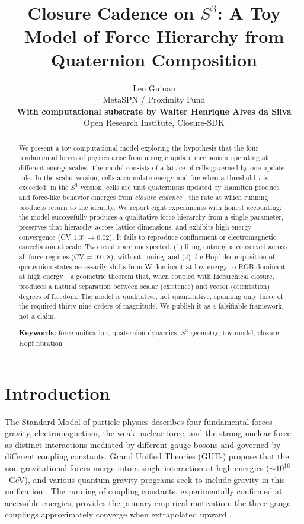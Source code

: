 \documentclass[letterpaper,12pt]{article}
\title{Closure Cadence on $S^3$: A Toy Model of Force Hierarchy from Quaternion Composition}
\author{
  Leo Guinan \\
  MetaSPN / Proximity Fund \\[6pt]
  \textbf{With computational substrate by Walter Henrique Alves da Silva} \\
  Open Research Institute, Closure-SDK
}
\date{}
\begin{document}
\maketitle

\begin{abstract}
We present a toy computational model exploring the hypothesis that the four fundamental forces of physics arise from a single update mechanism operating at different energy scales. The model consists of a lattice of cells governed by one update rule. In the scalar version, cells accumulate energy and fire when a threshold $\tau$ is exceeded; in the $S^3$ version, cells are unit quaternions updated by Hamilton product, and force-like behavior emerges from \emph{closure cadence}---the rate at which running products return to the identity. We report eight experiments with honest accounting: the model successfully produces a qualitative force hierarchy from a single parameter, preserves that hierarchy across lattice dimensions, and exhibits high-energy convergence (CV $1.37 \to 0.02$). It fails to reproduce confinement or electromagnetic cancellation at scale. Two results are unexpected: (1) firing entropy is conserved across all force regimes (CV = 0.018), without tuning; and (2) the Hopf decomposition of quaternion states necessarily shifts from W-dominant at low energy to RGB-dominant at high energy---a geometric theorem that, when coupled with hierarchical closure, produces a natural separation between scalar (existence) and vector (orientation) degrees of freedom. The model is qualitative, not quantitative, spanning only three of the required thirty-nine orders of magnitude. We publish it as a falsifiable framework, not a claim.

\medskip
\noindent\textbf{Keywords:} force unification, quaternion dynamics, $S^3$ geometry, toy model, closure, Hopf fibration
\end{abstract}

\section{Introduction}

The Standard Model of particle physics describes four fundamental forces---gravity, electromagnetism, the weak nuclear force, and the strong nuclear force---as distinct interactions mediated by different gauge bosons and governed by different coupling constants. Grand Unified Theories (GUTs) propose that the non-gravitational forces merge into a single interaction at high energies ($\sim 10^{16}$~GeV), and various quantum gravity programs seek to include gravity in this unification \cite{Georgi1974, Weinberg1967}. The running of coupling constants, experimentally confirmed at accessible energies, provides the primary empirical motivation: the three gauge couplings approximately converge when extrapolated upward \cite{Amaldi1991}.
\end{document}
